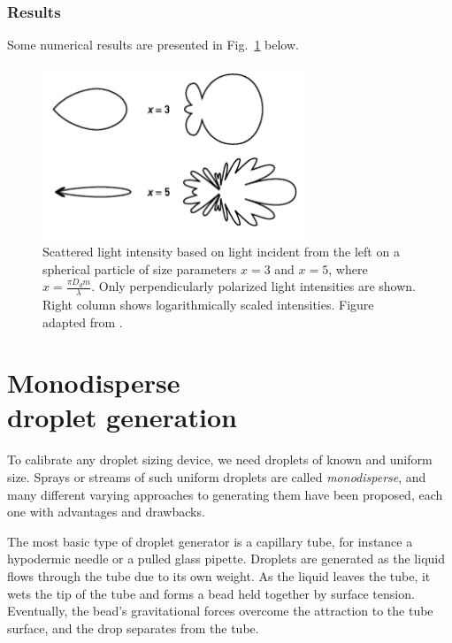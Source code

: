 \documentclass[11.5pt]{book}
\newcommand*{\figref}[1]{Fig.~\ref{#1}}
\begin{document}
\subsection{Results}
Some numerical results are presented in \figref{fig:angleresults} below.
\begin{figure}
    \centering
    \includegraphics[width=0.7\textwidth]{img/scattering/results.pdf}
    \caption{Scattered light intensity based on light incident from the left on a spherical particle of size parameters $x=3$ and $x=5$, where $x = \frac{\pi D_d m}{\lambda}$. Only perpendicularly polarized light intensities are shown. Right column shows logarithmically scaled intensities. Figure adapted from \citet{Albrecht03}.}
    \label{fig:angleresults}
\end{figure}


\chapter[Monodisperse droplet generation]{Monodisperse\\droplet generation}
\label{sec:droplet-generator}

To calibrate any droplet sizing device, we need droplets of known and uniform
size. Sprays or streams of such uniform droplets are called \emph{monodisperse},
and many different varying approaches to generating them have been proposed,
each one with advantages and drawbacks.

The most basic type of droplet generator is a capillary tube, for instance a
hypodermic needle or a pulled glass pipette. Droplets are generated as the
liquid flows through the tube due to its own weight. As the liquid leaves the
tube, it wets the tip of the tube and forms a bead held together by surface
tension. Eventually, the bead's gravitational forces overcome the attraction to
the tube surface, and the drop separates from the tube.
\end{document}
